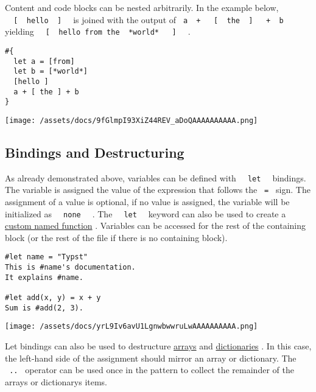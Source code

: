 Content and code blocks can be nested arbitrarily. In the example below,
\texttt{\ }{\texttt{\ {[}\ }}\texttt{\ hello\ }{\texttt{\ {]}\ }}\texttt{\ }
is joined with the output of
\texttt{\ a\ }{\texttt{\ +\ }}\texttt{\ }{\texttt{\ {[}\ }}\texttt{\ the\ }{\texttt{\ {]}\ }}\texttt{\ }{\texttt{\ +\ }}\texttt{\ b\ }
yielding
\texttt{\ }{\texttt{\ {[}\ }}\texttt{\ hello\ from\ the\ }{\texttt{\ *world*\ }}\texttt{\ }{\texttt{\ {]}\ }}\texttt{\ }
.

\begin{verbatim}
#{
  let a = [from]
  let b = [*world*]
  [hello ]
  a + [ the ] + b
}
\end{verbatim}

\texttt{[image: /assets/docs/9fGlmpI93XiZ44REV\_aDoQAAAAAAAAAA.png]}

\subsection{Bindings and Destructuring}\label{bindings}

As already demonstrated above, variables can be defined with
\texttt{\ }{\texttt{\ let\ }}\texttt{\ } bindings. The variable is
assigned the value of the expression that follows the \texttt{\ =\ }
sign. The assignment of a value is optional, if no value is assigned,
the variable will be initialized as
\texttt{\ }{\texttt{\ none\ }}\texttt{\ } . The
\texttt{\ }{\texttt{\ let\ }}\texttt{\ } keyword can also be used to
create a
\href{/docs/reference/foundations/function/\#defining-functions}{custom
named function} . Variables can be accessed for the rest of the
containing block (or the rest of the file if there is no containing
block).

\begin{verbatim}
#let name = "Typst"
This is #name's documentation.
It explains #name.

#let add(x, y) = x + y
Sum is #add(2, 3).
\end{verbatim}

\texttt{[image: /assets/docs/yrL9Iv6avU1LgnwbwwruLwAAAAAAAAAA.png]}

Let bindings can also be used to destructure
\href{/docs/reference/foundations/array/}{arrays} and
\href{/docs/reference/foundations/dictionary/}{dictionaries} . In this
case, the left-hand side of the assignment should mirror an array or
dictionary. The \texttt{\ ..\ } operator can be used once in the pattern
to collect the remainder of the array\textquotesingle s or
dictionary\textquotesingle s items.

